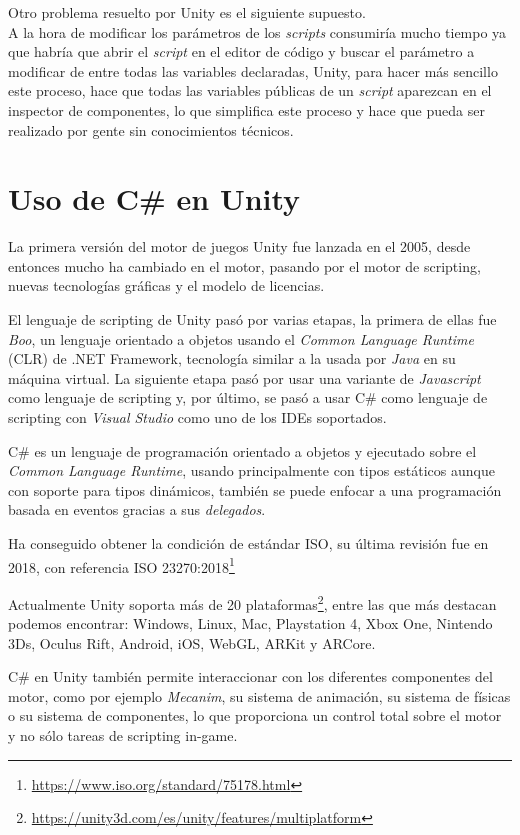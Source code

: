 \documentclass{pre-tfg}
\begin{document}
Otro problema resuelto por Unity es el siguiente supuesto. \\
A la hora de modificar los parámetros de los \emph{scripts} consumiría mucho tiempo ya que habría que abrir el \emph{script} en el editor de código y buscar el parámetro a modificar de entre todas las variables declaradas, Unity, para hacer más sencillo este proceso, hace que todas las variables públicas de un \emph{script} aparezcan en el inspector de componentes, lo que simplifica este proceso y hace que pueda ser realizado por gente sin conocimientos técnicos.

\section{Uso de C\# en Unity}

La primera versión del motor de juegos Unity fue lanzada en el 2005, desde entonces mucho ha cambiado en el motor, pasando por el motor de scripting, nuevas tecnologías gráficas y el modelo de licencias.

El lenguaje de scripting de Unity pasó por varias etapas, la primera de ellas fue \emph{Boo}, un lenguaje orientado a objetos usando el \emph{Common Language Runtime} (CLR) de .NET Framework, tecnología similar a la usada por \emph{Java} en su máquina virtual. La siguiente etapa pasó por usar una variante de \emph{Javascript} como lenguaje de scripting y, por último, se pasó a usar C\# como lenguaje de scripting con \emph{Visual Studio} como uno de los IDEs soportados.

C\# es un lenguaje de programación orientado a objetos y ejecutado sobre el \emph{Common Language Runtime}, usando principalmente con tipos estáticos aunque con soporte para tipos dinámicos, también se puede enfocar a una programación basada en eventos gracias a sus \emph{delegados}.

Ha conseguido obtener la condición de estándar ISO, su última revisión fue en 2018, con referencia ISO 23270:2018\footnote{\url{https://www.iso.org/standard/75178.html}}

Actualmente Unity soporta más de 20 plataformas\footnote{\url{https://unity3d.com/es/unity/features/multiplatform}}, entre las que más destacan podemos encontrar: Windows, Linux, Mac, Playstation 4, Xbox One, Nintendo 3Ds, Oculus Rift, Android, iOS, WebGL, ARKit y ARCore.

C\# en Unity también permite interaccionar con los diferentes componentes del motor, como por ejemplo \emph{Mecanim}, su sistema de animación, su sistema de físicas o su sistema de componentes, lo que proporciona un control total sobre el motor y no sólo tareas de scripting in-game.
\end{document}
